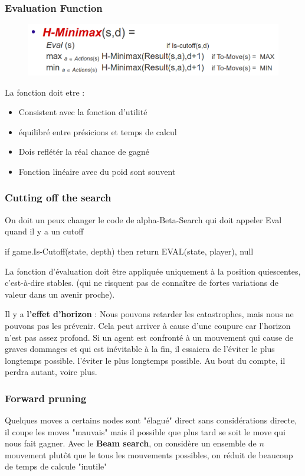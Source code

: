 		\subsubsection{Evaluation Function}
		
			\begin{figure}[H]
				\centering
				\includegraphics[width=\textwidth]{img/evalF.png}
			\end{figure}

			La fonction doit etre :
			\begin{itemize}
				\item Consistent avec la fonction d'utilité
				\item équilibré entre présicions et temps de calcul
				\item Dois reflétér la réal chance de gagné
				\item Fonction linéaire avec du poid sont souvent 
			\end{itemize}
			
		\subsubsection{Cutting off the search}
		
		On doit un peux changer le code de alpha-Beta-Search qui doit appeler Eval quand il y a un cutoff

		if game.Is-Cutoff(state, depth) then return EVAL(state, player), null
		
			
		La fonction d'évaluation doit être appliquée uniquement à la position quiescentes, c'est-à-dire stables. (qui ne risquent pas de connaître de fortes variations de valeur dans un avenir proche).			
			
			Il y a \textbf{l'effet d'horizon} : Nous pouvons retarder les catastrophes, mais nous ne pouvons pas les prévenir. Cela peut arriver à cause d'une coupure car l'horizon n'est pas assez profond. Si un agent est confronté à un mouvement qui cause de graves dommages et qui est inévitable à la fin, il essaiera de l'éviter le plus longtemps possible. l'éviter le plus longtemps possible. Au bout du compte, il perdra autant, voire plus.
			
		\subsubsection{Forward pruning}
			Quelques moves a certains nodes sont "élagué" direct sans considérations directe, il coupe les moves "mauvais" mais il possible que plus tard se soit le move qui nous fait gagner.
			Avec le \textbf{Beam search}, on considère un ensemble de $n$ mouvement plutôt que le tous les mouvements possibles, on réduit de beaucoup  de temps de calcule "inutile"
			
